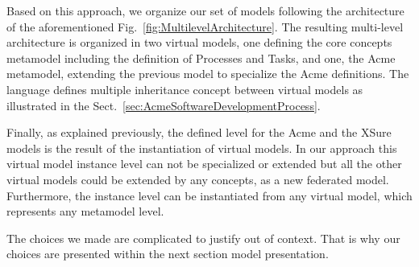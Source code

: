 
Based on this approach, we organize our set of models following the
architecture of the aforementioned Fig.~\ref{fig:MultilevelArchitecture}. The
resulting multi-level architecture is organized in two virtual models, one
defining the core concepts metamodel including the definition of Processes and
Tasks, and one, the Acme metamodel, extending the previous model to specialize
the Acme definitions. The \FML language defines multiple inheritance concept
between virtual models as illustrated in the Sect.~\ref{sec:AcmeSoftwareDevelopmentProcess}.

Finally, as explained previously, the defined level for the Acme  and the XSure models is the result of the instantiation of virtual models. In our approach this virtual model instance level can not be specialized or extended but all the other virtual models could be extended by any concepts, as a new federated model.
Furthermore, the instance level can be instantiated from any virtual model, which represents any metamodel level.




The choices we made are complicated to justify out of context. That is why our choices are presented within the next section model presentation.



